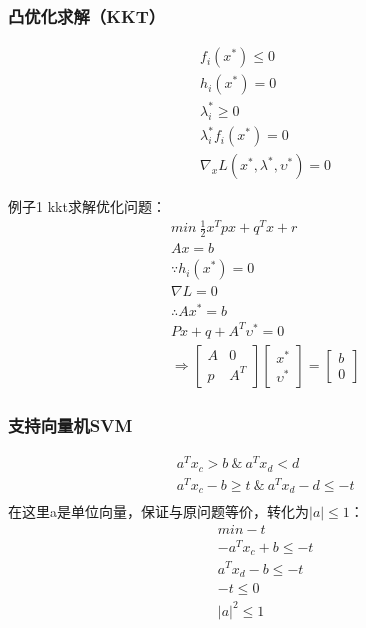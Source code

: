 \documentclass[UTF8]{../computerUniverse}
\begin{document}
\subsubsection{凸优化求解（KKT）}
\begin{equation}
\begin{split}
&f_i(x^*)\leqslant0\\
&h_i(x^*)=0\\
&\lambda_i^*\geqslant 0\\
&\lambda_i^*f_i(x^*)=0\\
&\nabla_x L(x^*,\lambda^*,\upsilon^*)=0
\end{split}
\end{equation}
 
例子1 kkt求解优化问题：
\begin{equation}
\begin{split}
&min\ \frac{1}{2}x^Tpx+q^Tx+r\\
&Ax=b\\
&\because h_i(x^*)=0\\
&\nabla L=0\\
&\therefore Ax^*=b\\
& Px+q+A^T \upsilon^*=0\\
&\Rightarrow \begin{bmatrix}
A &0\\ p& A^T
\end{bmatrix}
\begin{bmatrix}
x^* \\ \upsilon ^*
\end{bmatrix}=
\begin{bmatrix}
b\\0
\end{bmatrix}
\end{split}
\end{equation}

\subsubsection{支持向量机SVM}
\begin{equation}
\begin{split}
&a^Tx_c>b \ \& \ a^Tx_d<d\\
&a^Tx_c-b\geqslant t \ \& \ a^Tx_d-d\leqslant -t\\
\end{split}
\end{equation}
在这里a是单位向量，保证与原问题等价，转化为$|a|\leqslant1$：
\begin{equation}
    \begin{split}
    &min -t\\
    &-a^Tx_c+b\leqslant-t\\
    &a^Tx_d-b \leqslant -t\\
    &-t\leqslant0\\
    &|a|^2\leqslant1
    \end{split}
\end{equation}
\end{document}
